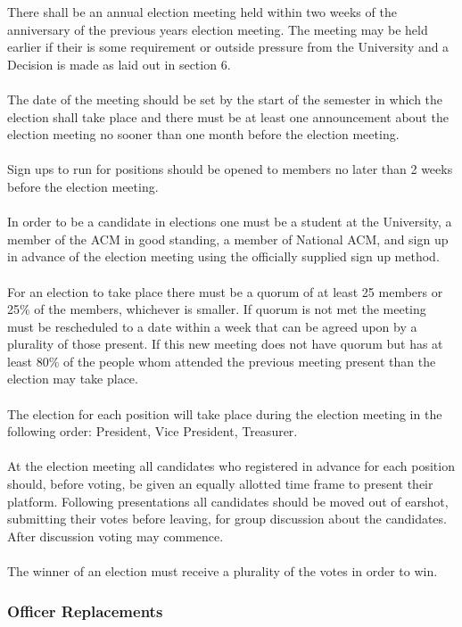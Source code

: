 \documentclass[12pt,titlepage]{article}
\begin{document}
There shall be an annual election meeting held within two weeks of the anniversary of the previous years election meeting. The meeting may be held earlier if their is some requirement or outside pressure from the University and a Decision is made as laid out in section 6.\\
\\
The date of the meeting should be set by the start of the semester in which the election shall take place and there must be at least one announcement about the election meeting no sooner than one month before the election meeting.\\
\\
Sign ups to run for positions should be opened to members no later than 2 weeks before the election meeting.\\
\\
In order to be a candidate in elections one must be a student at the University, a member of the ACM in good standing, a member of National ACM, and sign up in advance of the election meeting using the officially supplied sign up method.\\
\\
For an election to take place there must be a quorum of at least 25 members or 25\% of the members, whichever is smaller. If quorum is not met the meeting must be rescheduled to a date within a week that can be agreed upon by a plurality of those present. If this new meeting does not have quorum but has at least 80\% of the people whom attended the previous meeting present than the election may take place.\\
\\
The election for each position will take place during the election meeting in the following order: President, Vice President, Treasurer.\\
\\
At the election meeting all candidates who registered in advance for each position should, before voting, be given an equally allotted time frame to present their platform. Following presentations all candidates should be moved out of earshot, submitting their votes before leaving, for group discussion about the candidates. After discussion voting may commence.\\
\\
The winner of an election must receive a plurality of the votes in order to win.

\subsubsection{Officer Replacements}
\end{document}
